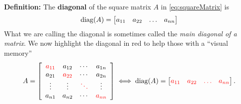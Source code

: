 \begin{tcolorbox}
\textbf{Definition:} The \textbf{diagonal} of the square matrix $A$ in \eqref{eq:squareMatrix} is
\begin{equation}
    {\rm diag}(A)=\begin{bmatrix}a_{11} & a_{22} & \ldots & a_{nn} \end{bmatrix}
\end{equation}
What we are calling the diagonal is sometimes called the \textit{main diagonal of a matrix}. We now highlight the diagonal in red to help those with a ``visual memory''
$$
 A=\left[\begin{array}{cccc} \color{red} a_{11} & a_{12} & \cdots & a_{1n}\\
a_{21} & \color{red} a_{22} & \cdots & a_{2n} \\ \vdots & \vdots & \color{red} \ddots& \vdots \\
a_{n1} & a_{n2} & \cdots & \color{red} a_{nn}\\\end{array}\right] \iff {\rm diag}(A)=\begin{bmatrix}\color{red} a_{11} & \color{red} a_{22} & \color{red} \ldots & \color{red} a_{nn} \end{bmatrix}.
$$
\end{tcolorbox}

